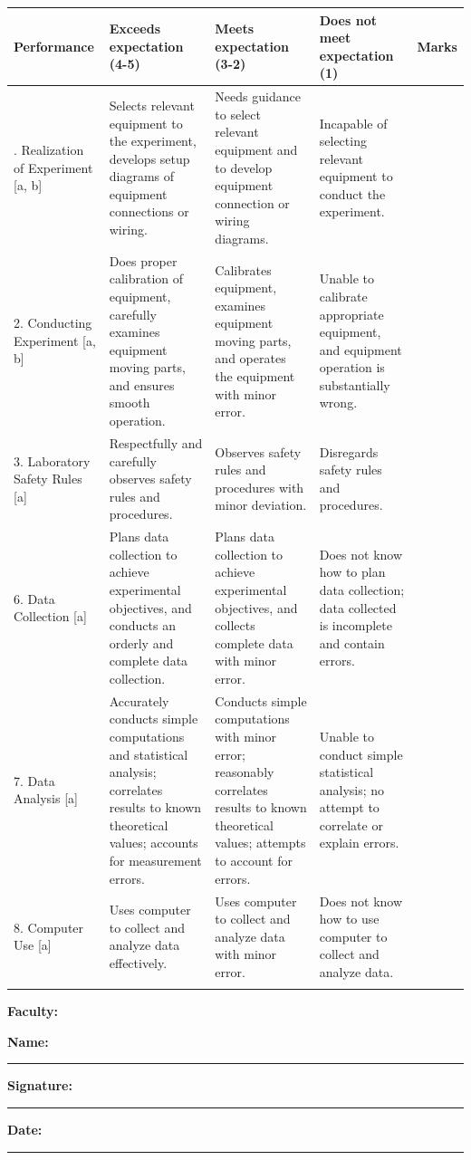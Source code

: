 \documentclass[12pt,a4paper]{article}
\begin{document}
{\scriptsize %
\renewcommand{\arraystretch}{1.5}
\noindent
\begin{tabularx}{\textwidth}{|>{\raggedright\arraybackslash}p{}|>{\raggedright\arraybackslash}X|>{\raggedright\arraybackslash}X|>{\raggedright\arraybackslash}X|c|}
\hline
\textbf{Performance} & 
\textbf{Exceeds expectation (4-5)} & 
\textbf{Meets expectation (3-2)} & 
\textbf{Does not meet expectation (1)} & 
\textbf{Marks} \\
\hline

1. Realization of Experiment [a, b] & 
Selects relevant equipment to the experiment, develops setup diagrams of equipment connections or wiring. & 
Needs guidance to select relevant equipment and to develop equipment connection or wiring diagrams. & 
Incapable of selecting relevant equipment to conduct the experiment. & 
\\ \hline

2. Conducting Experiment [a, b] & 
Does proper calibration of equipment, carefully examines equipment moving parts, and ensures smooth operation. & 
Calibrates equipment, examines equipment moving parts, and operates the equipment with minor error. & 
Unable to calibrate appropriate equipment, and equipment operation is substantially wrong. & 
\\ \hline

3. Laboratory Safety Rules [a] & 
Respectfully and carefully observes safety rules and procedures. & 
Observes safety rules and procedures with minor deviation. & 
Disregards safety rules and procedures. & 
\\ \hline

6. Data Collection [a] & 
Plans data collection to achieve experimental objectives, and conducts an orderly and complete data collection. & 
Plans data collection to achieve experimental objectives, and collects complete data with minor error. & 
Does not know how to plan data collection; data collected is incomplete and contain errors. & 
\\ \hline

7. Data Analysis [a] & 
Accurately conducts simple computations and statistical analysis; correlates results to known theoretical values; accounts for measurement errors. & 
Conducts simple computations with minor error; reasonably correlates results to known theoretical values; attempts to account for errors. & 
Unable to conduct simple statistical analysis; no attempt to correlate or explain errors. & 
\\ \hline

8. Computer Use [a] & 
Uses computer to collect and analyze data effectively. & 
Uses computer to collect and analyze data with minor error. & 
Does not know how to use computer to collect and analyze data. & 
\\ \hline

\multicolumn{4}{|r|}{\textbf{Total}} & \\
\hline
\end{tabularx}
\renewcommand{\arraystretch}{1.0}
}

\textbf{Faculty:}

\textbf{Name:} \rule{5cm}{0.4pt}

\textbf{Signature:} \rule{5cm}{0.4pt}

\textbf{Date:} \rule{5cm}{0.4pt}
\end{document}
